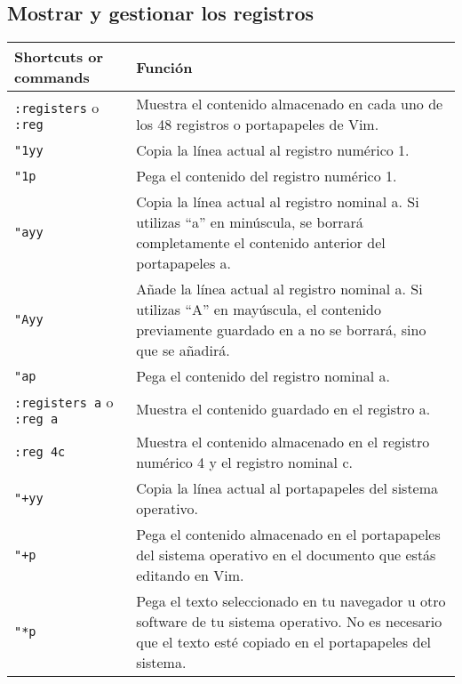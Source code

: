 \documentclass[
  doc,
  floatsintext,
  longtable,
  a4paper,
  nolmodern,
  notxfonts,
  notimes,
  colorlinks=true,linkcolor=blue,citecolor=blue,urlcolor=blue]{apa7}
\begin{document}
\subsection{Mostrar y gestionar los
registros}\label{mostrar-y-gestionar-los-registros}

\begin{longtable}[]{@{}
  >{\raggedright\arraybackslash}p{}
  >{\raggedright\arraybackslash}p{}@{}}
\toprule\noalign{}
\begin{minipage}[b]{\linewidth}\raggedright
Shortcuts or commands
\end{minipage} & \begin{minipage}[b]{\linewidth}\raggedright
Función
\end{minipage} \\
\midrule\noalign{}
\endhead
\bottomrule\noalign{}
\endlastfoot
\texttt{:registers} o \texttt{:reg} & Muestra el contenido almacenado en
cada uno de los 48 registros o portapapeles de Vim. \\
\texttt{"1yy} & Copia la línea actual al registro numérico 1. \\
\texttt{"1p} & Pega el contenido del registro numérico 1. \\
\texttt{"ayy} & Copia la línea actual al registro nominal a. Si utilizas
``a'' en minúscula, se borrará completamente el contenido anterior del
portapapeles a. \\
\texttt{"Ayy} & Añade la línea actual al registro nominal a. Si utilizas
``A'' en mayúscula, el contenido previamente guardado en a no se
borrará, sino que se añadirá. \\
\texttt{"ap} & Pega el contenido del registro nominal a. \\
\texttt{:registers\ a} o \texttt{:reg\ a} & Muestra el contenido
guardado en el registro a. \\
\texttt{:reg\ 4c} & Muestra el contenido almacenado en el registro
numérico 4 y el registro nominal c. \\
\texttt{"+yy} & Copia la línea actual al portapapeles del sistema
operativo. \\
\texttt{"+p} & Pega el contenido almacenado en el portapapeles del
sistema operativo en el documento que estás editando en Vim. \\
\texttt{"*p} & Pega el texto seleccionado en tu navegador u otro
software de tu sistema operativo. No es necesario que el texto esté
copiado en el portapapeles del sistema. \\

\end{longtable}
\end{document}
